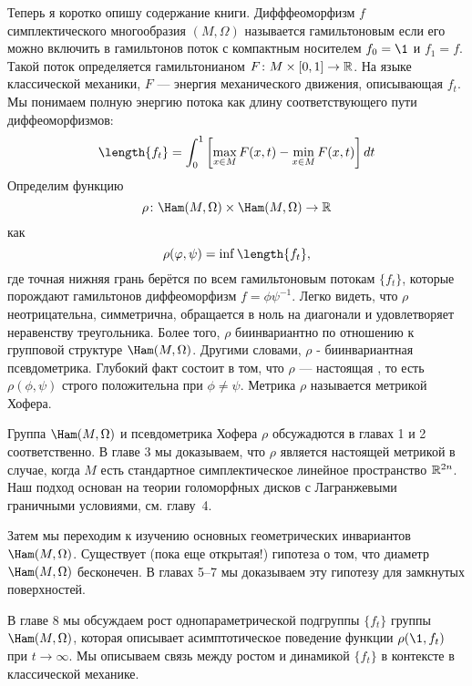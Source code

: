 Теперь я коротко опишу содержание книги.
Дифффеоморфизм $f$ симплектического многообразия $(M,\Omega)$
называется гамильтоновым если его можно включить в гамильтонов поток
 с компактным носителем   $f_0=\1$ и $f_1 =f$.
Такой поток определяется гамильтонианом $F\colon M \times [0, 1] \to \mathbb{R}$.
На языке классической механики, $F$ --- энергия механического движения, описывающая $f_t$.
Мы понимаем полную энергию потока как длину соответствующего пути диффеоморфизмов:
\[\length \{f_t\} =
\int_0^1\left[\max_{x\in M}F(x,t)-\min_{x\in M}F(x,t)\right] dt 
\]%
Определим функцию
\[\rho\: \Ham(M,\Omega) \times \Ham(M,\Omega) \to \RR\]
как
\[\rho (\phi, \psi) = \inf \length \{f_t\},\]
где точная нижняя грань берётся по всем гамильтоновым потокам $\{f_t\}$, которые
порождают гамильтонов диффеоморфизм $f = \phi\psi^{-1}$.
Легко видеть, что $\rho$ неотрицательна, симметрична, обращается в ноль на диагонали и удовлетворяет неравенству треугольника.
Более того, $\rho$ биинвариантно по отношению к групповой структуре  $\Ham(M,\Omega)$.
Другими словами, $\rho$ - биинвариантная псевдометрика.
Глубокий факт состоит в том, что $\rho$ --- настоящая , то есть $\rho (\phi, \psi)$ строго положительна при $\phi \ne \psi$.
Метрика $\rho$ называется метрикой Хофера.

Группа $\Ham(M,\Omega)$ и псевдометрика Хофера $\rho$ обсужадются в главах 1 и 2 соответственно.
В главе 3 мы доказываем, что $\rho$ является настоящей метрикой в случае, когда $M$ есть стандартное симплектическое линейное пространство $\mathbb{R}^{2n}$.
Наш подход основан на теории  голоморфных дисков  с Лагранжевыми граничными условиями, см.
главу~4.

Затем мы переходим к изучению основных геометрических инвариантов $\Ham(M,\Omega)$.
Существует (пока еще открытая!) гипотеза о том, что диаметр $\Ham(M,\Omega)$ бесконечен.
В главах 5--7 мы доказываем эту гипотезу для замкнутых поверхностей.

В главе 8 мы обсуждаем рост однопараметрической подгруппы $\{f_t\}$ группы $\Ham(M,\Omega)$, которая описывает асимптотическое поведение функции $\rho (\1, f_t)$ при $t \to \infty$.
Мы описываем связь между ростом и динамикой $\{f_t\}$ в контексте
 в классической механике.

